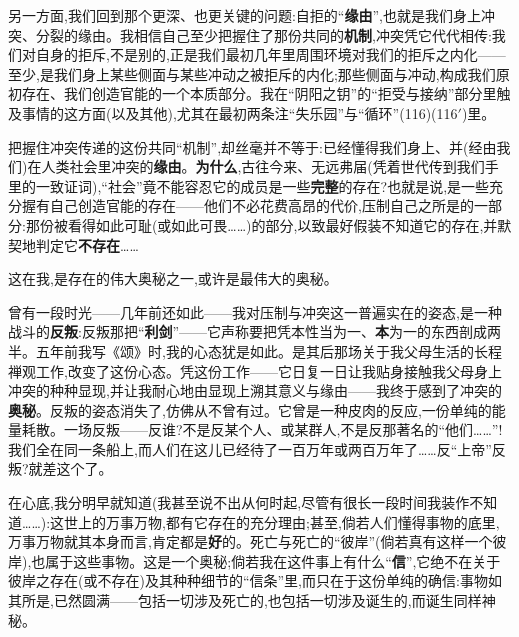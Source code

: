 另一方面,我们回到那个更深、也更关键的问题:自拒的“\textbf{缘由}”,也就是我们身上冲突、分裂的缘由。我相信自己至少把握住了那份共同的\textbf{机制},冲突凭它代代相传:我们对自身的拒斥,不是别的,正是我们最初几年里周围环境对我们的拒斥之内化——至少,是我们身上某些侧面与某些冲动之被拒斥的内化;那些侧面与冲动,构成我们原初存在、我们创造官能的一个本质部分。我在“阴阳之钥”的“拒受与接纳”部分里触及事情的这方面(以及其他),尤其在最初两条注“失乐园”与“循环”(116)(116$'$)里。

把握住冲突传递的这份共同“机制”,却丝毫并不等于:已经懂得我们身上、并(经由我们)在人类社会里冲突的\textbf{缘由}。\textbf{为什么},古往今来、无远弗届(凭着世代传到我们手里的一致证词),“社会”竟不能容忍它的成员是一些\textbf{完整}的存在?也就是说,是一些充分\dmark{}握有自己创造官能的存在——他们不必花费高昂的代价,压制自己之所是的一部分:那份被看得如此可耻(或如此可畏……)的部分,以致最好假装不知道它的存在,并默契地判定它\textbf{不存在}……

这在我,是存在的伟大奥秘之一,或许是最伟大的奥秘。

曾有一段时光——几年前还如此——我对压制与冲突这一普遍实在的姿态,是一种战斗的\textbf{反叛}:反叛那把“\textbf{利剑}”——它声称要把凭本性当为一、\textbf{本}为一的东西剖成两半。五年前我写《颂》时,我的心态犹是如此。是其后那场关于我父母生活的长程禅观工作,改变了这份心态。凭这份工作——它日复一日让我贴身接触我父母身上冲突的种种显现,并让我耐心地由显现上溯其意义与缘由——我终于感到了冲突的\textbf{奥秘}。反叛的姿态消失了,仿佛从不曾有过。它曾是一种皮肉的反应,一份单纯的能量耗散。一场反叛——反谁?不是反某个人、或某群人,不是反那著名的“他们……”!我们全在同一条船上,而人们在这儿已经待了一百万年或两百万年了……反“上帝”反叛?就差这个了。

\dmark{}在心底,我分明早就知道(我甚至说不出从何时起,尽管有很长一段时间我装作不知道……):这世上的万事万物,都有它存在的充分理由;甚至,倘若人们懂得事物的底里,万事万物就其本身而言,肯定都是\textbf{好}的。死亡与死亡的“彼岸”(倘若真有这样一个彼岸),也属于这些事物。这是一个奥秘;倘若我在这件事上有什么“\textbf{信}”,它绝不在关于彼岸之存在(或不存在)及其种种细节的“信条”里,而只在于这份单纯的确信:事物如其所是,已然圆满——包括一切涉及死亡的,也包括一切涉及诞生的,而诞生同样神秘。

